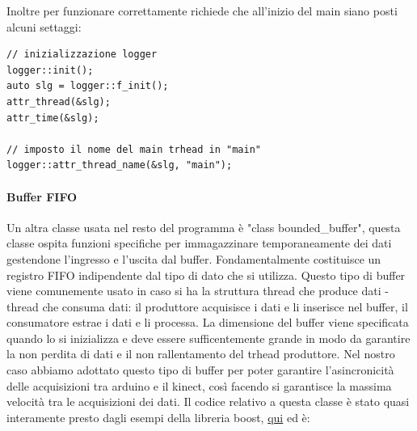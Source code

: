\documentclass[10pt,a4paper]{article}
\begin{document}
Inoltre per funzionare correttamente richiede che all'inizio del main siano posti alcuni settaggi:
\begin{lstlisting}[style=mycpp, caption=librerie usate, captionpos=b]
// inizializzazione logger
logger::init();
auto slg = logger::f_init();
attr_thread(&slg);
attr_time(&slg);

// imposto il nome del main trhead in "main"
logger::attr_thread_name(&slg, "main");
\end{lstlisting}
%
%
\paragraph{Buffer FIFO}
Un altra classe usata nel resto del programma \`e "class bounded\_buffer", questa classe ospita funzioni specifiche per immagazzinare temporaneamente dei dati gestendone l'ingresso e l'uscita dal buffer. Fondamentalmente costituisce un registro FIFO indipendente dal tipo di dato che si utilizza. Questo tipo di buffer viene comunemente usato in caso si ha la struttura thread che produce dati - thread che consuma dati: il produttore acquisisce i dati e li inserisce nel buffer, il consumatore estrae i dati e li processa. La dimensione del buffer viene specificata quando lo si inizializza e deve essere sufficentemente grande in modo da garantire la non perdita di dati e il non rallentamento del trhead produttore. Nel nostro caso abbiamo adottato questo tipo di buffer per poter garantire l'asincronicit\`a delle acquisizioni tra arduino e il kinect, cos\`i facendo si garantisce la massima velocit\`a tra le acquisizioni dei dati. Il codice relativo a questa classe \`e stato quasi interamente presto dagli esempi della libreria boost, \href{https://www.boost.org/doc/libs/1_69_0/doc/html/circular_buffer/examples.html}{qui} ed \`e:
\end{document}

